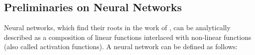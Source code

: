 \subsection{Preliminaries on Neural Networks}
\label{subsection:ch2-preliminaries_on_neural_networks}


%


Neural networks, which find their roots in the work of \citet{mcculloch1943logical,rosenblatt1958perceptron}, can be analytically described as a composition of linear functions interlaced with non-linear functions (also called activation functions).
A neural network can be defined as follows:

